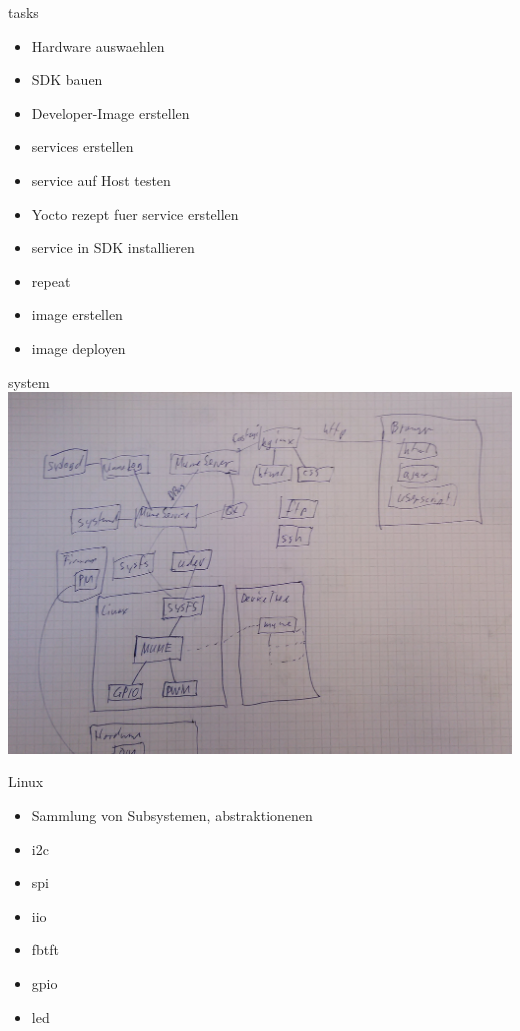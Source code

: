 
\begin{frame}{tasks}
	\begin{itemize}
		\item Hardware auswaehlen
		\item SDK bauen
		\item Developer-Image erstellen
		\item services erstellen
		\item service auf Host testen
		\item Yocto rezept fuer service erstellen
		\item service in SDK installieren
		\item repeat
		\item image erstellen
		\item image deployen
	\end{itemize}
\end{frame}


\begin{frame}{system}
	\includegraphics[width=\textwidth]{res/system.jpg}
\end{frame}

\begin{frame}{Linux}
	\begin{itemize}
		\item Sammlung von Subsystemen, abstraktionenen
		\item i2c
		\item spi
		\item iio
		\item fbtft
		\item gpio
		\item led
	\end{itemize}
\end{frame}

